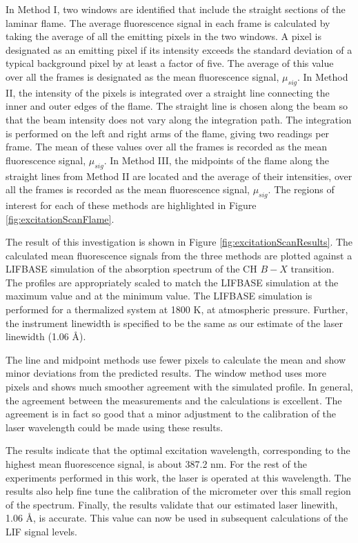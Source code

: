 In Method I, two windows are identified that include the straight sections of the laminar flame.
The average fluorescence signal in each frame is calculated by taking the average of all the emitting pixels in the two windows.
A pixel is designated as an emitting pixel if its intensity exceeds the standard deviation of a typical background pixel by at least a factor of five.
The average of this value over all the frames is designated as the mean fluorescence signal, \(\mu_{sig}\).
In Method II, the intensity of the pixels is integrated over a straight line connecting the inner and outer edges of the flame.
The straight line is chosen along the beam so that the beam intensity does not vary along the integration path.
The integration is performed on the left and right arms of the flame, giving two readings per frame.
The mean of these values over all the frames is recorded as the mean fluorescence signal, \(\mu_{sig}\).
In Method III, the midpoints of the flame along the straight lines from Method II are located and the average of their intensities, over all the frames is recorded as the mean fluorescence signal, \(\mu_{sig}\).
The regions of interest for each of these methods are highlighted in Figure \ref{fig:excitationScanFlame}.

The result of this investigation is shown in Figure \ref{fig:excitationScanResults}.
The calculated mean fluorescence signals from the three methods are plotted against a LIFBASE simulation of the absorption spectrum of the CH \(B-X\) transition.
The profiles are appropriately scaled to match the LIFBASE simulation at the maximum value and at the minimum value.
The LIFBASE simulation is performed for a thermalized system at 1800 K, at atmospheric pressure.
Further, the instrument linewidth is specified to be the same as our estimate of the laser linewidth (1.06 \AA).

The line and midpoint methods use fewer pixels to calculate the mean and show minor deviations from the predicted results.
The window method uses more pixels and shows much smoother agreement with the simulated profile.
In general, the agreement between the measurements and the calculations is excellent.
The agreement is in fact so good that a minor adjustment to the calibration of the laser wavelength could be made using these results.

The results indicate that the optimal excitation wavelength, corresponding to the highest mean fluorescence signal, is about 387.2 nm.
For the rest of the experiments performed in this work, the laser is operated at this wavelength.
The results also help fine tune the calibration of the micrometer over this small region of the spectrum.
Finally, the results validate that our estimated laser linewith, 1.06 \AA, is accurate.
This value can now be used in subsequent calculations of the LIF signal levels.

